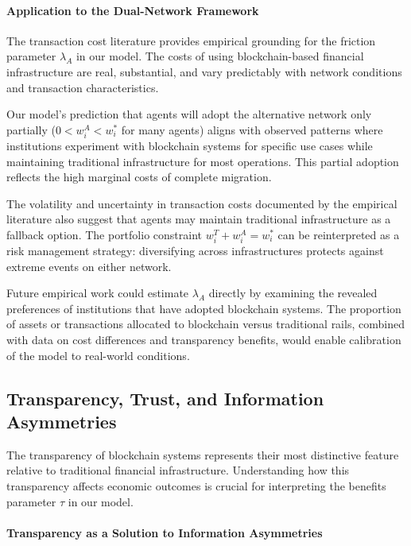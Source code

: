 \paragraph{Application to the Dual-Network Framework}

The transaction cost literature provides empirical grounding for the friction parameter $\lambda_A$ in our model. The costs of using blockchain-based financial infrastructure are real, substantial, and vary predictably with network conditions and transaction characteristics.

Our model's prediction that agents will adopt the alternative network only partially ($0 < w_i^A < w_i^*$ for many agents) aligns with observed patterns where institutions experiment with blockchain systems for specific use cases while maintaining traditional infrastructure for most operations. This partial adoption reflects the high marginal costs of complete migration.

The volatility and uncertainty in transaction costs documented by the empirical literature also suggest that agents may maintain traditional infrastructure as a fallback option. The portfolio constraint $w_i^T + w_i^A = w_i^*$ can be reinterpreted as a risk management strategy: diversifying across infrastructures protects against extreme events on either network.

Future empirical work could estimate $\lambda_A$ directly by examining the revealed preferences of institutions that have adopted blockchain systems. The proportion of assets or transactions allocated to blockchain versus traditional rails, combined with data on cost differences and transparency benefits, would enable calibration of the model to real-world conditions.

\subsection{Transparency, Trust, and Information Asymmetries}

The transparency of blockchain systems represents their most distinctive feature relative to traditional financial infrastructure. Understanding how this transparency affects economic outcomes is crucial for interpreting the benefits parameter $\tau$ in our model.

\paragraph{Transparency as a Solution to Information Asymmetries}

